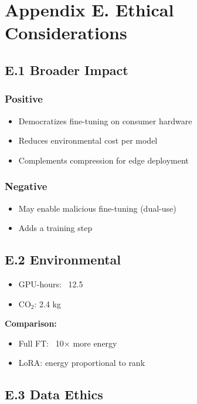 \section{Appendix E. Ethical Considerations}

\subsection{E.1 Broader Impact}

\subsubsection{Positive}
\begin{itemize}
\item Democratizes fine-tuning on consumer hardware
\item Reduces environmental cost per model
\item Complements compression for edge deployment

\end{itemize}
\subsubsection{Negative}
\begin{itemize}
\item May enable malicious fine-tuning (dual-use)
\item Adds a training step

\end{itemize}
\subsection{E.2 Environmental}

\begin{itemize}
\item GPU-hours: ~12.5
\item CO$_2$: 2.4 kg

\end{itemize}
\textbf{Comparison:}
\begin{itemize}
\item Full FT: ~10$\times$ more energy
\item LoRA: energy proportional to rank

\end{itemize}
\subsection{E.3 Data Ethics}

